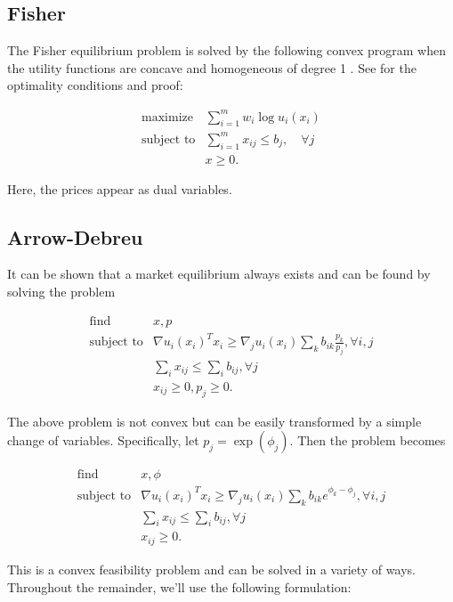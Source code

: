 \documentclass{article}
\begin{document}
\subsection{Fisher}

The Fisher equilibrium problem is solved by the following convex program when the utility functions are concave and homogeneous of degree 1 \cite{eisenberg1959consensus, gale1960theory, eisenberg1961aggregation}.
See \cite[Section~6.2]{nisan2007algorithmic} for the optimality conditions and proof:

\[
\begin{array}{ll}
\mbox{maximize} & \sum_{i=1}^m w_i \log u_i(x_i) \\
\mbox{subject to} & \sum_{i=1}^m x_{ij} \leq b_j, \quad \forall j\\
& x \geq 0.
\end{array}
\]

Here, the prices appear as dual variables.

\subsection{Arrow-Debreu}
It can be shown that a market equilibrium always exists and can be found by solving the problem

\[
\begin{array}{ll}
\mbox{find} & x, p \\
\mbox{subject to} & \nabla u_i(x_i)^T x_i \geq  \nabla_j u_i(x_i) \sum_k b_{ik} \frac{p_k}{p_j}, \forall i,j\\
& \sum_i x_{ij} \leq \sum_i b_{ij}, \forall j\\
& x_{ij} \geq 0, p_j \geq 0.
\end{array}
\]


The above problem is not convex but can be easily transformed by a simple change of variables. Specifically, let $p_j = \exp(\phi_j)$.
Then the problem becomes

\[
\begin{array}{ll}
\mbox{find} & x, \phi \\
\mbox{subject to} & \nabla u_i(x_i)^T x_i \geq  \nabla_j u_i(x_i) \sum_k b_{ik} e^{\phi_k - \phi_j}, \forall i,j\\
& \sum_i x_{ij} \leq \sum_i b_{ij}, \forall j\\
& x_{ij} \geq 0.
\end{array}
\]

This is a convex feasibility problem and can be solved in a variety of ways.
Throughout the remainder, we'll use the following formulation:
\end{document}

